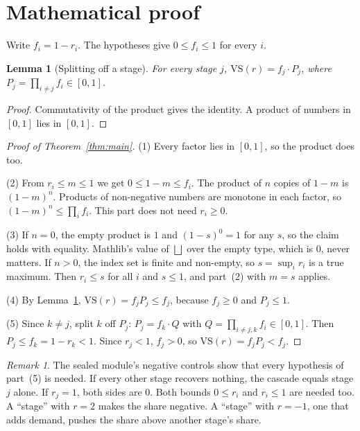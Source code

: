 \documentclass[11pt]{article}
\newtheorem{lemma}[theorem]{Lemma}
\theoremstyle{definition}
\theoremstyle{remark}
\newtheorem*{remark}{Remark}
\begin{document}
\section{Mathematical proof}
\label{sec:math}
Write $f_i=1-r_i$. The hypotheses give $0\le f_i\le1$ for every $i$.

\begin{lemma}[Splitting off a stage]\label{lem:split}
For every stage $j$, $\mathrm{VS}(r)=f_j\cdot P_j$, where $P_j=\prod_{i\ne j}f_i\in[0,1]$.
\end{lemma}
\begin{proof}
Commutativity of the product gives the identity. A product of numbers in $[0,1]$ lies in
$[0,1]$.
\end{proof}

\begin{proof}[Proof of Theorem~\ref{thm:main}]
(1) Every factor lies in $[0,1]$, so the product does too.

(2) From $r_i\le m\le1$ we get $0\le1-m\le f_i$. The product of $n$ copies of $1-m$ is
$(1-m)^n$. Products of non-negative numbers are monotone in each factor, so
$(1-m)^n\le\prod_i f_i$. This part does not need $r_i\ge0$.

(3) If $n=0$, the empty product is $1$ and $(1-s)^0=1$ for any $s$, so the claim holds with
equality. Mathlib's value of $\bigsqcup$ over the empty type, which is $0$, never matters. If
$n>0$, the index set is finite and non-empty, so $s=\sup_i r_i$ is a true maximum. Then $r_i\le
s$ for all $i$ and $s\le1$, and part~(2) with $m=s$ applies.

(4) By Lemma~\ref{lem:split}, $\mathrm{VS}(r)=f_jP_j\le f_j$, because $f_j\ge0$ and $P_j\le1$.

(5) Since $k\ne j$, split $k$ off $P_j$: $P_j=f_k\cdot Q$ with $Q=\prod_{i\ne j,k}f_i\in[0,1]$.
Then $P_j\le f_k=1-r_k<1$. Since $r_j<1$, $f_j>0$, so $\mathrm{VS}(r)=f_jP_j<f_j$.
\end{proof}

\begin{remark}
The sealed module's negative controls show that every hypothesis of part~(5) is needed. If
every other stage recovers nothing, the cascade equals stage $j$ alone. If $r_j=1$, both sides
are $0$. Both bounds $0\le r_i$ and $r_i\le1$ are needed too. A ``stage'' with $r=2$ makes the
share negative. A ``stage'' with $r=-1$, one that adds demand, pushes the share above another
stage's share.
\end{remark}
\end{document}
